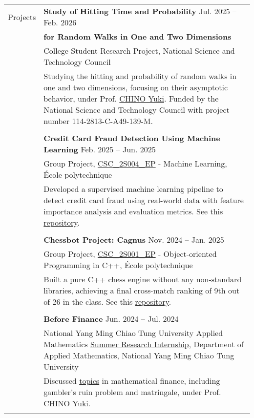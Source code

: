 \documentclass[letterpaper, 11pt]{article}
\begin{document}
\begin{center}
\begin{longtable}{p{0.76in}p{5.93in}}

        {\textcolor{OliveGreen}{Projects}} & \textbf{Study of Hitting Time and Probability} \hfill Jul. 2025 -- Feb. 2026\\
        & \textbf{\quad \quad \quad for Random Walks in One and Two Dimensions} \\
        & College Student Research Project, National Science and Technology Council\\
        & Studying the hitting and probability of random walks in one and two dimensions, focusing on their asymptotic behavior, under Prof. \href{https://scholar.nycu.edu.tw/en/persons/yuki-chino}{CHINO Yuki}. Funded by the National Science and Technology Council with project number 114-2813-C-A49-139-M.\\
        & \\
        

        & \textbf{Credit Card Fraud Detection Using Machine Learning} \hfill Feb. 2025 -- Jun. 2025\\
        & Group Project, \href{https://synapses.polytechnique.fr/catalogue/2024-2025/ue/47/CSC-2S004-EP-machine-learning?from=D12}{CSC\_2S004\_EP} - Machine Learning, École polytechnique\\
        & Developed a supervised machine learning pipeline to detect credit card fraud using real-world data with feature importance analysis and evaluation metrics. See this \href{https://github.com/eiken59/ml_project/blob/main/README.md}{repository}.\\
        & \\

        & \textbf{Chessbot Project: Cagnus} \hfill Nov. 2024 -- Jan. 2025\\
        & Group Project, \href{https://synapses.polytechnique.fr/catalogue/2024-2025/ue/32/CSC-2F001-EP-object-oriented-programming-in-c?from=D12}{CSC\_2S001\_EP} - Object-oriented Programming in C++, École polytechnique\\
        & Built a pure C++ chess engine without any non-standard libraries, achieving a final cross-match ranking of 9th out of 26 in the class. See this \href{https://github.com/jetzypetz/chess_bot/blob/main/docs/README.md}{repository}.\\
        & \\
        
        & \textbf{Before Finance} \hfill Jun. 2024 -- Jul. 2024\\
        & National Yang Ming Chiao Tung University Applied Mathematics \href{https://teshenglin.github.io/courses/2024_summer_research/}{Summer Research Internship}, Department of Applied Mathematics, National Yang Ming Chiao Tung University\\
        & Discussed \href{https://hackmd.io/@eiken-sc11/B1QcaW3B0}{topics} in mathematical finance, including gambler's ruin problem and matringale, under Prof. CHINO Yuki.\\
        & \\
        


\end{longtable}
\end{center}
\end{document}
